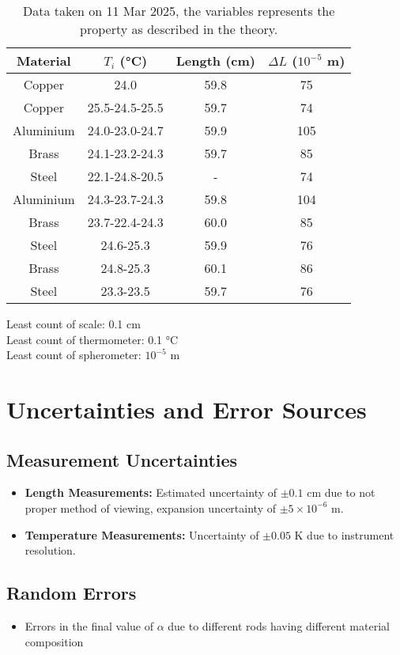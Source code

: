 \documentclass[%
 sor,
 jor,
 amsmath,amssymb,
 reprint,
]{revtex4-2}
\begin{document}
\begin{table}[h]
\centering
\begin{tabular}{|c|ccc|}
    \hline
    Material & $T_i$ (\si{\celsius})  & Length (cm) & $\Delta L$ ($10^{-5}$ m)\\
    \hline
    Copper 	& 24.0     & 59.8 & 75 \\
    Copper 	& 25.5-24.5-25.5 & 59.7 & 74\\
    Aluminium 	& 24.0-23.0-24.7 & 59.9 & 105\\
    Brass 	& 24.1-23.2-24.3 & 59.7 & 85 \\
    Steel 	& 22.1-24.8-20.5 & - & 74 \\
    Aluminium 	& 24.3-23.7-24.3 & 59.8 & 104\\
    Brass 	& 23.7-22.4-24.3 & 60.0 & 85 \\
    Steel 	& 24.6-25.3 & 59.9 & 76 \\
    Brass	& 24.8-25.3 & 60.1 & 86 \\
    Steel 	& 23.3-23.5 & 59.7 & 76 \\ 
    \hline
\end{tabular}
\caption{Data taken on 11 Mar 2025, the variables represents the property as described in the theory.}
\end{table}
Least count of scale: 0.1 cm  \\
Least count of thermometer: 0.1 $\si{\celsius}$ \\
Least count of spherometer: $10^{-5}$ m  \\


\section{Uncertainties and Error Sources}
\subsection{Measurement Uncertainties}
\begin{itemize}
    \item \textbf{Length Measurements:} Estimated uncertainty of $\pm 0.1$ cm due to not proper method of viewing, expansion uncertainty of $\pm 5\times 10^{-6}$ m.
    \item \textbf{Temperature Measurements:} Uncertainty of $\pm 0.05$ \si{\kelvin} due to instrument resolution.
\end{itemize}

\subsection{Random Errors}
\begin{itemize}
	\item Errors in the final value of $\alpha$ due to different rods having different material composition 
\end{itemize}
\end{document}
